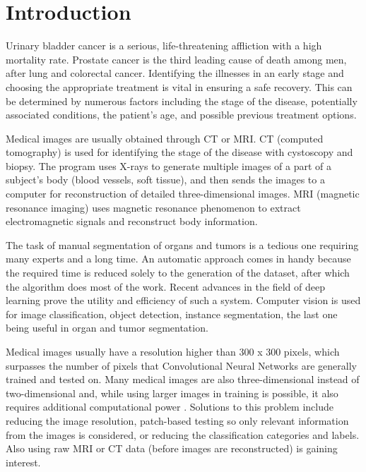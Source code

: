 \documentclass[runningheads,a4paper,11pt]{report}
\begin{document}
\tableofcontents

\newpage

\listoffigures

\newpage




\newpage



\chapter{Introduction}
\label{chapter:introduction}

Urinary bladder cancer is a serious, life-threatening affliction with a high mortality rate. Prostate cancer is the third leading cause of death among men, after lung and colorectal cancer. Identifying the illnesses in an early stage and choosing the appropriate treatment is vital in ensuring a safe recovery. This can be determined by numerous factors including the stage of the disease, potentially associated conditions, the patient's age, and possible previous treatment options.

Medical images are usually obtained through CT or MRI. CT (computed tomography) is used for identifying the stage of the disease with cystoscopy and biopsy. The program uses X-rays to generate multiple images of a part of a subject's body (blood vessels, soft tissue), and then sends the images to a computer for reconstruction of detailed three-dimensional images. MRI (magnetic resonance imaging) uses magnetic resonance phenomenon to extract electromagnetic signals and reconstruct body information.

The task of manual segmentation of organs and tumors is a tedious one requiring many experts and a long time. An automatic approach comes in handy because the required time is reduced solely to the generation of the dataset, after which the algorithm does most of the work. Recent advances in the field of deep learning prove the utility and efficiency of such a system. Computer vision is used for image classification, object detection, instance segmentation, the last one being useful in organ and tumor segmentation.

Medical images usually have a resolution higher than 300 x 300 pixels, which surpasses the number of pixels that Convolutional Neural Networks are generally trained and tested on. Many medical images are also three-dimensional instead of two-dimensional and, while using larger images in training is possible, it also requires additional computational power \cite{willemink2020preparing}. Solutions to this problem include reducing the image resolution, patch-based testing so only relevant information from the images is considered, or reducing the classification categories and labels. Also using raw MRI or CT data (before images are reconstructed) is gaining interest. 
 
\end{document}
